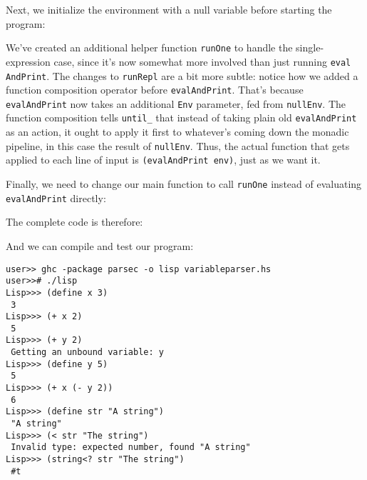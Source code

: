 Next, we initialize the environment with a null variable before starting the program:
 
 
\sloppy
We've created an additional helper function \verb|runOne| to handle the single-expression case, since it's now somewhat more involved than just running \verb|eval| \verb|And|\verb|Print|. The changes to \verb|runRepl| are a bit more subtle: notice how we added a function composition operator before \verb|evalAndPrint|. That's because \verb|evalAndPrint| now takes an additional \verb|Env| parameter, fed from \verb|nullEnv|. The function composition tells \verb|until_| that instead of taking plain old \verb|evalAndPrint| as an action, it ought to apply it first to whatever's coming down the monadic pipeline, in this case the result of \verb|nullEnv|. Thus, the actual function that gets applied to each line of input is \lstinline|(evalAndPrint env)|, just as we want it.
\fussy
 
Finally, we need to change our main function to call \verb|runOne| instead of evaluating \verb|evalAndPrint| directly:
 
 
The complete code is therefore:
 
 
And we can compile and test our program:
 
\begin{lstlisting}[language=shell,numbers=none,nolol]
user>> ghc -package parsec -o lisp variableparser.hs
user>># ./lisp
Lisp>>> (define x 3)
 3
Lisp>>> (+ x 2)
 5
Lisp>>> (+ y 2)
 Getting an unbound variable: y
Lisp>>> (define y 5)
 5
Lisp>>> (+ x (- y 2))
 6
Lisp>>> (define str "A string")
 "A string"
Lisp>>> (< str "The string")
 Invalid type: expected number, found "A string"
Lisp>>> (string<? str "The string")
 #t
 \end{lstlisting}
